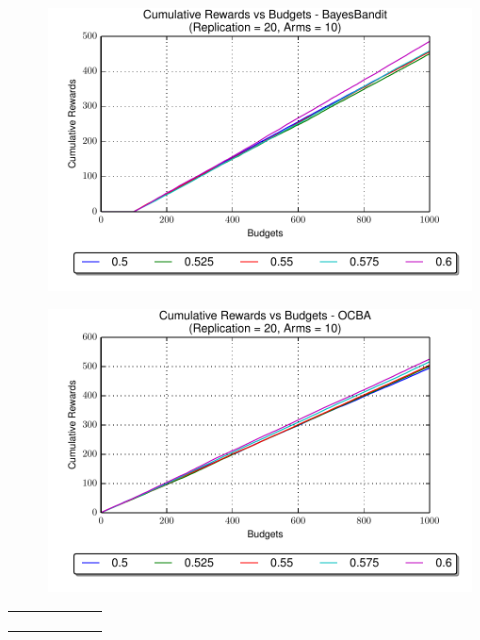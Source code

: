 \documentclass[compress]{beamer}
\begin{document}
\begin{frame}
\smaller
\begin{minipage}{0.48\textwidth}
\begin{figure}[p]
    \centering
    \includegraphics[page=1,width=\textwidth]{1BayesBandit_rate_series_cumulative_rewards.pdf}
\end{figure}
\begin{figure}[p]
    \centering
    \includegraphics[page=1,width=\textwidth]{2OCBA_rate_series_cumulative_rewards.pdf}
\end{figure}
\end{minipage}%
\hfill
\begin{minipage}{0.48\textwidth}
\begin{tabular}{p{\textwidth}}
\begin{figure}[p]
    \centering

\end{figure}
\end{tabular}
\end{minipage}
\end{frame}
\end{document}
